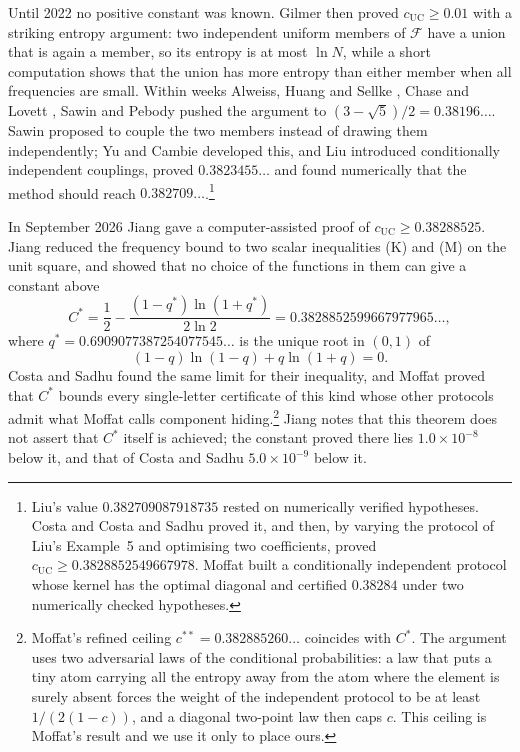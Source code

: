 \documentclass[12pt]{article}
\theoremstyle{plain}
\newcommand{\cF}{\mathcal{F}}
\newcommand{\qs}{q^{*}}
\newcommand{\Cs}{C^{*}}
\begin{document}
Until 2022 no positive constant was known. Gilmer \cite{Gil22} then proved $c_{\mathrm{UC}}\ge 0.01$ with a striking entropy argument: two independent uniform members of $\cF$ have a union that is again a member, so its entropy is at most $\ln N$, while a short computation shows that the union has more entropy than either member when all frequencies are small. Within weeks Alweiss, Huang and Sellke \cite{AHS24}, Chase and Lovett \cite{CL22}, Sawin \cite{Saw22} and Pebody \cite{Peb22} pushed the argument to $(3-\sqrt5)/2=0.38196\ldots$. Sawin proposed to couple the two members instead of drawing them independently; Yu \cite{Yu23} and Cambie \cite{Cam22} developed this, and Liu \cite{Liu23} introduced conditionally independent couplings, proved $0.3823455\ldots$ and found numerically that the method should reach $0.382709\ldots$.\footnote{Liu's value $0.382709087918735$ rested on numerically verified hypotheses. Costa \cite{Cos26} and Costa and Sadhu \cite{CS26} proved it, and then, by varying the protocol of Liu's Example~5 and optimising two coefficients, proved $c_{\mathrm{UC}}\ge 0.3828852549667978$. Moffat \cite{Mof26} built a conditionally independent protocol whose kernel has the optimal diagonal and certified $0.38284$ under two numerically checked hypotheses.}

In September 2026 Jiang \cite{Jia26} gave a computer-assisted proof of $c_{\mathrm{UC}}\ge 0.38288525$. Jiang reduced the frequency bound to two scalar inequalities (K) and (M) on the unit square, and showed that no choice of the functions in them can give a constant above
\begin{equation}\label{eq:Cstar}
\Cs=\frac12-\frac{(1-\qs)\ln(1+\qs)}{2\ln 2}=0.3828852599667977965\ldots,
\end{equation}
where $\qs=0.6909077387254077545\ldots$ is the unique root in $(0,1)$ of
\begin{equation}\label{eq:qstar}
(1-q)\ln(1-q)+q\ln(1+q)=0 .
\end{equation}
Costa and Sadhu \cite{CS26} found the same limit for their inequality, and Moffat \cite{Mof26} proved that $\Cs$ bounds every single-letter certificate of this kind whose other protocols admit what Moffat calls component hiding.\footnote{Moffat's refined ceiling $c^{**}=0.382885260\ldots$ coincides with $\Cs$. The argument uses two adversarial laws of the conditional probabilities: a law that puts a tiny atom carrying all the entropy away from the atom where the element is surely absent forces the weight of the independent protocol to be at least $1/(2(1-c))$, and a diagonal two-point law then caps $c$. This ceiling is Moffat's result and we use it only to place ours.} Jiang notes that this theorem does not assert that $\Cs$ itself is achieved; the constant proved there lies $1.0\times10^{-8}$ below it, and that of Costa and Sadhu $5.0\times 10^{-9}$ below it.
\end{document}
